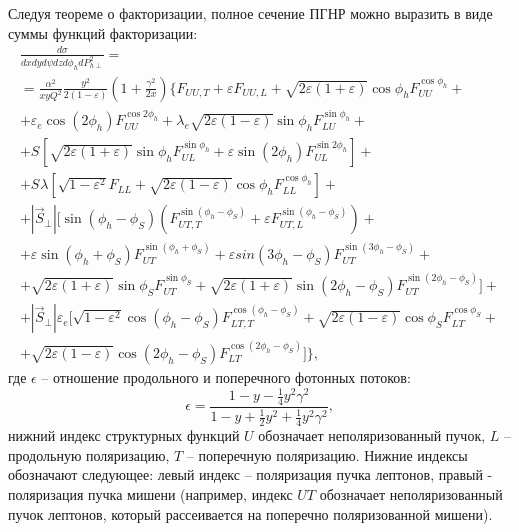 \documentclass{extarticle}
\begin{document}
Следуя теореме о факторизации, полное сечение ПГНР можно выразить в виде суммы функций факторизации:
\begin{multline} 
	\label{sigma}
	\frac{d\sigma}{dx dy d \psi dz d \phi_{h} dP^{2}_{h \perp}} = \\
	= \frac{\alpha^2}{xy Q^{2}} \frac{y^2}{2 (1 - \varepsilon)} \left(1 + \frac{\gamma^2}{2x} \right)
	\Biggl \lbrace F_{U U, T} +
	\varepsilon F_{U U, L} +
	\sqrt{2 \varepsilon (1 + \varepsilon)} \cos \phi_h F_{UU}^{\cos \phi_h} + \\
	+ \varepsilon_e \cos(2\phi_h) F_{U U}^{\cos 2\phi_h} +
	\lambda_e \sqrt{2 \varepsilon (1 - \varepsilon)} \sin \phi_h F_{L U}^{\sin \phi_h} + \\
	+ S_{} \left [ \sqrt{2 \varepsilon (1 + \varepsilon)} \sin \phi_h F_{UL}^{\sin \phi_h} +
	\varepsilon \sin(2\phi_h) F_{UL}^{\sin 2\phi_h} \right] + \\
	+ S_{} \lambda \left [ \sqrt{1 - \varepsilon^2} F_{L L} +
	\sqrt{2 \varepsilon (1 - \varepsilon)} \cos \phi_h F_{LL}^{\cos \phi_h} \right] + \\
	+ |\vec S_{\perp}| \Biggl[ \sin(\phi_h - \phi_S) \left(F_{U T, T}^{\sin(\phi_h - \phi_S)} +
	\varepsilon F_{UT, L}^{\sin(\phi_h - \phi_S)} \right) + \\
	+ \varepsilon \sin(\phi_h + \phi_S) F_{U T}^{\sin (\phi_h + \phi_S)} +
	\varepsilon sin (3\phi_h - \phi_S) F_{UT}^{\sin (3\phi_h - \phi_S)} + \\
	+ \sqrt{2 \varepsilon (1 + \varepsilon)} \sin \phi_S F_{UT}^{\sin \phi_S} +
	\sqrt{2 \varepsilon (1 + \varepsilon)} \sin(2\phi_h - \phi_S) F_{UT}^{\sin(2\phi_h - \phi_S)}  \Biggr] + \\
	+ |\vec S_{\perp}| \varepsilon_e \Biggl[ \sqrt{1 - \varepsilon^2} \cos(\phi_h - \phi_S) F_{LT, T}^{\cos(\phi_h - \phi_S)} +
	\sqrt{2 \varepsilon (1 - \varepsilon)} \cos \phi_S F_{LT}^{\cos \phi_S} + \\
	+ \sqrt{2 \varepsilon (1 - \varepsilon)} \cos(2\phi_h - \phi_S) F_{LT}^{\cos(2\phi_h - \phi_S)}  \Biggr] \Biggr \rbrace,
\end{multline}
где $\epsilon$ -- отношение продольного и поперечного фотонных потоков:
\begin{equation}
	\epsilon = \frac{1-y-\frac{1}{4}y^2\gamma^2}{1-y+\frac{1}{2} y^2 +\frac{1}{4}y^2\gamma^2},
\end{equation}
нижний индекс структурных функций $U$ обозначает неполяризованный пучок, $L$ -- продольную поляризацию, $T$ -- поперечную поляризацию. Нижние индексы обозначают следующее: левый индекс -- поляризация пучка лептонов, правый - поляризация пучка мишени (например, индекс $UT$ обозначает неполяризованный пучок лептонов, который рассеивается на поперечно поляризованной мишени).
\end{document}
